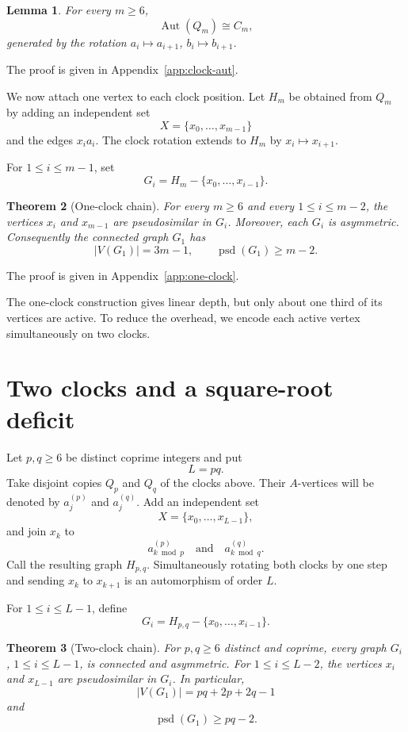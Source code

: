 \documentclass[11pt]{article}
\newtheorem{theorem}{Theorem}[section]
\newtheorem{lemma}[theorem]{Lemma}
\theoremstyle{definition}
\theoremstyle{remark}
\newcommand{\Aut}{\operatorname{Aut}}
\newcommand{\psd}{\operatorname{psd}}
\begin{document}
\begin{lemma}\label{lem:clock-aut}
For every $m\ge6$,
\[
    \Aut(Q_m)\cong C_m,
\]
generated by the rotation $a_i\mapsto a_{i+1}$, $b_i\mapsto b_{i+1}$.
\end{lemma}


\par\noindent The proof is given in Appendix~\ref{app:clock-aut}.


We now attach one vertex to each clock position. Let $H_m$ be obtained from $Q_m$ by adding an independent set
\[
    X=\{x_0,\ldots,x_{m-1}\}
\]
and the edges $x_i a_i$. The clock rotation extends to $H_m$ by $x_i\mapsto x_{i+1}$.

For $1\le i\le m-1$, set
\[
    G_i=H_m-\{x_0,\ldots,x_{i-1}\}.
\]

\begin{theorem}[One-clock chain]\label{thm:one-clock}
For every $m\ge6$ and every $1\le i\le m-2$, the vertices $x_i$ and $x_{m-1}$ are pseudosimilar in $G_i$. Moreover, each $G_i$ is asymmetric. Consequently the connected graph $G_1$ has
\[
    |V(G_1)|=3m-1,
    \qquad
    \psd(G_1)\ge m-2.
\]
\end{theorem}


\par\noindent The proof is given in Appendix~\ref{app:one-clock}.

The one-clock construction gives linear depth, but only about one third of its vertices are active. To reduce the overhead, we encode each active vertex simultaneously on two clocks.

\section{Two clocks and a square-root deficit}

Let $p,q\ge6$ be distinct coprime integers and put
\[
    L=pq.
\]
Take disjoint copies $Q_p$ and $Q_q$ of the clocks above. Their $A$-vertices will be denoted by $a^{(p)}_j$ and $a^{(q)}_j$. Add an independent set
\[
    X=\{x_0,\ldots,x_{L-1}\},
\]
and join $x_k$ to
\[
    a^{(p)}_{k\bmod p}
    \quad\text{and}\quad
    a^{(q)}_{k\bmod q}.
\]
Call the resulting graph $H_{p,q}$. Simultaneously rotating both clocks by one step and sending $x_k$ to $x_{k+1}$ is an automorphism of order $L$.

For $1\le i\le L-1$, define
\[
    G_i=H_{p,q}-\{x_0,\ldots,x_{i-1}\}.
\]

\begin{theorem}[Two-clock chain]\label{thm:two-clock}
For $p,q\ge6$ distinct and coprime, every graph $G_i$, $1\le i\le L-1$, is connected and asymmetric. For $1\le i\le L-2$, the vertices $x_i$ and $x_{L-1}$ are pseudosimilar in $G_i$. In particular,
\[
    |V(G_1)|=pq+2p+2q-1
\]
and
\[
    \psd(G_1)\ge pq-2.
\]
\end{theorem}
\end{document}
